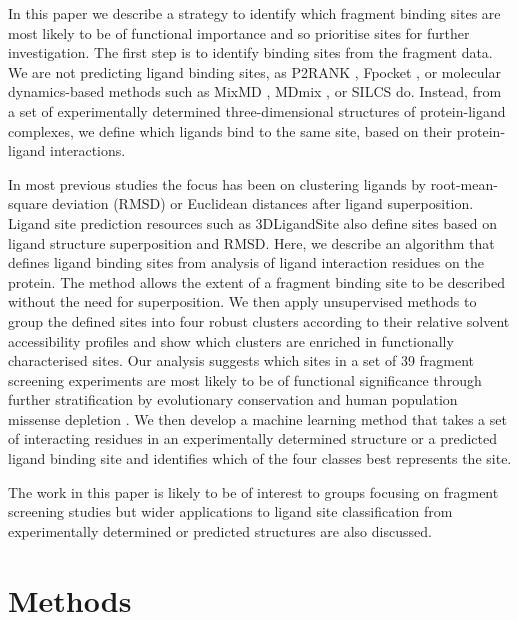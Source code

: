 In this paper we describe a strategy to identify which fragment binding sites are most likely to be of functional importance and so prioritise sites for further investigation. The first step is to identify binding sites from the fragment data. We are not predicting ligand binding sites, as P2RANK \cite{KRIVAK_2018_P2RANK}, Fpocket \cite{GUILLOUX_2009_FPOCKET}, or molecular dynamics-based methods such as MixMD \cite{LEXA_2011_FLEXIBILITY, GHANAKOTA_2018_MIXMD}, MDmix \cite{ALVAREZ_2014_MIXMD}, or SILCS \cite{FALLER_2015_SILCS} do. Instead, from a set of experimentally determined three-dimensional structures of protein-ligand complexes, we define which ligands bind to the same site, based on their protein-ligand interactions.

In most previous studies the focus has been on clustering ligands by  root-mean-square deviation (RMSD) \cite{SHIN_2005_PDBLIGAND} or Euclidean distances \cite{KOZAKOV_2005_CLUSTERING} after ligand superposition. Ligand site prediction resources such as 3DLigandSite \cite{WASS_2010_3DLIGANDSITE, MCGREIG_2022_3DLIGANDSITE} also define sites based on ligand structure superposition and RMSD. Here, we describe an algorithm that defines ligand binding sites from analysis of ligand interaction residues on the protein. The method allows the extent of a fragment binding site to be described without the need for superposition. We then apply unsupervised methods to group the defined sites into four robust clusters according to their relative solvent accessibility profiles and show which clusters are enriched in functionally characterised sites. Our analysis suggests which sites in a set of 39 fragment screening experiments are most likely to be of functional significance through further stratification by evolutionary conservation and human population missense depletion \cite{MACGOWAN_2017_VARIANTS, MACGOWAN_2024_VARIANTS}. We then develop a machine learning method that takes a set of interacting residues in an experimentally determined structure or a predicted ligand binding site and identifies which of the four classes best represents the site. 

The work in this paper is likely to be of interest to groups focusing on fragment screening studies but wider applications to ligand site classification from experimentally determined or predicted structures are also discussed. 

\section{Methods}
\label{sec:ch_FRAGSYS_methods}

